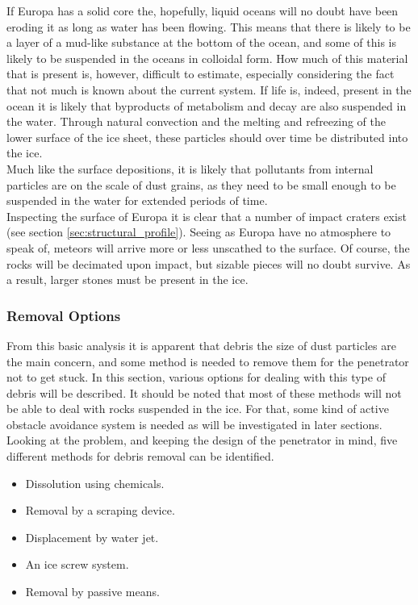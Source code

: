 \noindent
If Europa has a solid core the, hopefully, liquid oceans will no doubt have been eroding it as long as water has been flowing. This means that there is likely to be a layer of a mud-like substance at the bottom of the ocean, and some of this is likely to be suspended in the oceans in colloidal form. How much of this material that is present is, however, difficult to estimate, especially considering the fact that not much is known about the current system. If life is, indeed, present in the ocean it is likely that byproducts of metabolism and decay are also suspended in the water. Through natural convection and the melting and refreezing of the lower surface of the ice sheet, these particles should over time be distributed into the ice. \\
Much like the surface depositions, it is likely that pollutants from internal particles are on the scale of dust grains, as they need to be small enough to be suspended in the water for extended periods of time.\\

\noindent
Inspecting the surface of Europa it is clear that a number of impact craters exist (see section \ref{sec:structural_profile}). Seeing as Europa have no atmosphere to speak of, meteors will arrive more or less unscathed to the surface. Of course, the rocks will be decimated upon impact, but sizable pieces will no doubt survive. As a result, larger stones must be present in the ice.  \\

\subsubsection{Removal Options}
From this basic analysis it is apparent that debris the size of dust particles are the main concern, and some method is needed to remove them for the penetrator not to get stuck. In this section, various options for dealing with this type of debris will be described. It should be noted that most of these methods will not be able to deal with rocks suspended in the ice. For that, some kind of active obstacle avoidance system is needed as will be investigated in later sections.\\
Looking at the problem, and keeping the design of the penetrator in mind, five different methods for debris removal can be identified.
\begin{itemize}
	\item Dissolution using chemicals.
	\item Removal by a scraping device.
	\item Displacement by water jet.
	\item An ice screw system.
	\item Removal by passive means.
\end{itemize}

